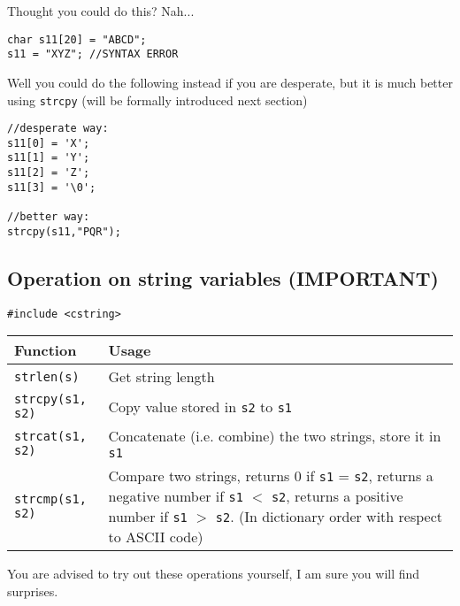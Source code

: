 Thought you could do this? Nah...

\begin{lstlisting}
char s11[20] = "ABCD";
s11 = "XYZ"; //SYNTAX ERROR
\end{lstlisting}

Well you could do the following instead if you are desperate, but it is much better using \texttt{strcpy} (will be formally introduced next section)

\begin{lstlisting}
//desperate way:
s11[0] = 'X'; 
s11[1] = 'Y'; 
s11[2] = 'Z'; 
s11[3] = '\0'; 

//better way:
strcpy(s11,"PQR");
\end{lstlisting}


\subsection{Operation on string variables (IMPORTANT)}

\begin{lstlisting}
#include <cstring>
\end{lstlisting}

\begin{table}[h]
    \centering
    \begin{tabular}{|m{9em}|m{25em}|}
        \hline
        \textbf{Function} & 
        Usage 
        \\ \hline \hline
        
        \texttt{strlen(s)} &
        Get string length
        \\ \hline
        
        \texttt{strcpy(s1, s2)} &
        Copy value stored in \texttt{s2} to \texttt{s1} 
        \\ \hline
        
        \texttt{strcat(s1, s2)} &
        Concatenate (i.e. combine) the two strings, store it in \texttt{s1} 
        \\ \hline
        
        \texttt{strcmp(s1, s2)} &
        Compare two strings, returns 0 if \texttt{s1} = \texttt{s2}, returns a negative number if \texttt{s1} $<$ \texttt{s2}, returns a positive number if \texttt{s1} $>$ \texttt{s2}. (In dictionary order with respect to ASCII code)
        \\ \hline
    \end{tabular}
\end{table}

You are advised to try out these operations yourself, I am sure you will find surprises.

